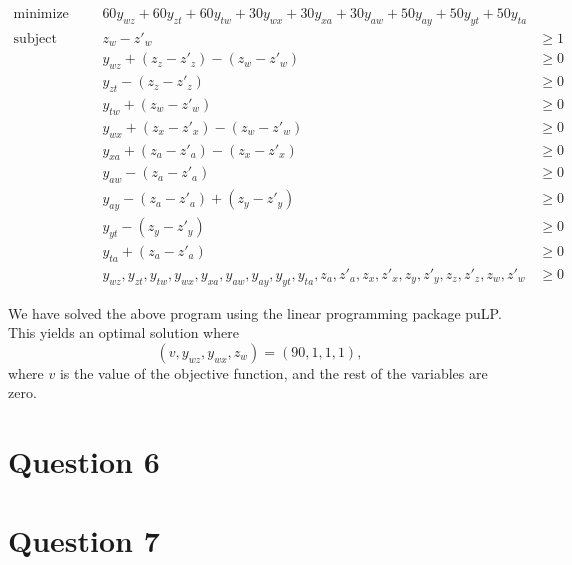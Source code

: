 \documentclass[a4paper, 10pt, oneside, article]{memoir}
\begin{document}
\begin{align*}
\text{minimize}   &&& 60y_{wz} + 60y_{zt} + 60y_{tw} + 30y_{wx} + 30y_{xa} + 30y_{aw} + 50y_{ay} + 50y_{yt} + 50y_{ta}  \\
\text{subject to} &&& z_{w}  -z'_{w} &\geq 1 \\
                  &&&y_{wz} + (z_{z}  -z'_{z})  - (z_{w} - z'_{w}) &\geq 0 \\
                  &&&y_{zt}  - (z_{z} - z'_{z}) &\geq 0 \\
                  &&&y_{tw} + (z_{w}  -z'_{w}) &\geq 0 \\
                  &&&y_{wx} + (z_{x}  -z'_{x})  -(z_{w} -  z'_{w}) &\geq 0 \\
                  &&&y_{xa} + (z_{a}  -z'_{a})  -(z_{x} - z'_{x}) &\geq 0 \\
                  &&&y_{aw}  -(z_{a} - z'_{a}) &\geq 0 \\
                  &&&y_{ay}  -(z_{a} - z'_{a}) + (z_{y}  -z'_{y}) &\geq 0 \\
                  &&&y_{yt}  -(z_{y} - z'_{y}) &\geq 0 \\
                  &&&y_{ta} + (z_{a}  -z'_{a}) &\geq 0 \\
                  &&& y_{wz}, y_{zt}, y_{tw}, y_{wx}, y_{xa}, y_{aw}, y_{ay}, y_{yt}, y_{ta}, z_{a}, z'_{a}, z_{x}, z'_{x}, z_{y}, z'_{y}, z_{z}, z'_{z}, z_{w}, z'_{w} &\geq 0
\end{align*}

We have solved the above program using the linear programming package
puLP. This yields an optimal solution where
\begin{equation*}
(v, y_{wz}, y_{wx}, z_{w}) =(90, 1, 1, 1),
\end{equation*}
where $v$ is the value of the objective function, and the rest of the
variables are zero.

\section*{Question 6}




\section*{Question 7}



\end{document}
